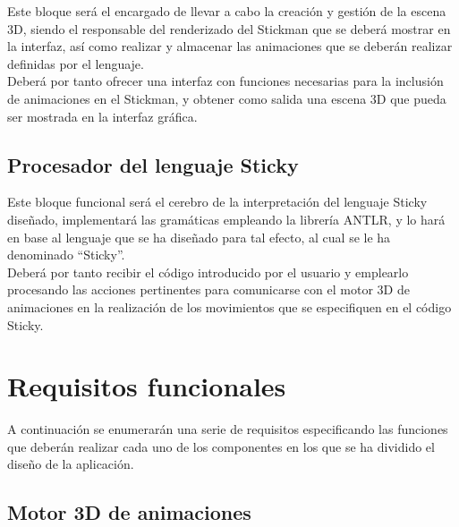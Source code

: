 \documentclass[11pt,a4paper]{report}
\begin{document}
Este bloque será el encargado de llevar a cabo la creación y gestión de la escena 3D, siendo el responsable del renderizado del Stickman que se deberá
mostrar en la interfaz, así como realizar y almacenar las animaciones que se deberán realizar definidas por el lenguaje. \\

Deberá por tanto ofrecer una interfaz con funciones necesarias para la inclusión de animaciones en el Stickman, y obtener como salida una escena 3D que
pueda ser mostrada en la interfaz gráfica. \\

\subsection{Procesador del lenguaje Sticky}
\label{sec-1.1.2}


Este bloque funcional será el cerebro de la interpretación del lenguaje Sticky diseñado, implementará las gramáticas empleando la librería ANTLR, y lo hará
en base al lenguaje que se ha diseñado para tal efecto, al cual se le ha denominado ``Sticky''.\\

Deberá por tanto recibir el código introducido por el usuario y emplearlo procesando las acciones pertinentes para comunicarse con el motor 3D de
animaciones en la realización de los movimientos que se especifiquen en el código Sticky. \\

\section{Requisitos funcionales}
\label{sec-1.2}


A continuación se enumerarán una serie de requisitos especificando las funciones que deberán realizar cada uno de los componentes en los que se ha dividido
el diseño de la aplicación. \\

\subsection{Motor 3D de animaciones}
\label{sec-1.2.1}
\end{document}
